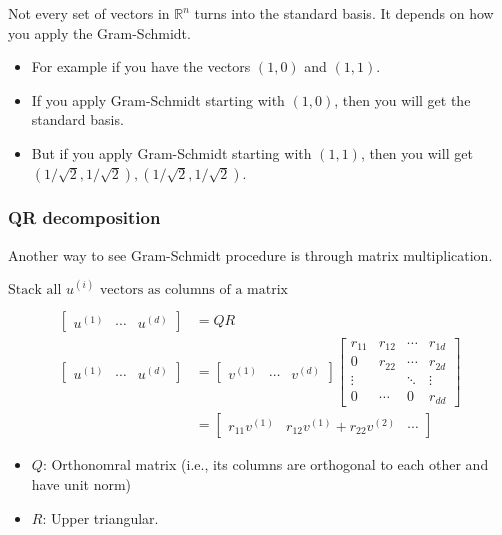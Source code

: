     \begin{warning}
        Not every set of vectors in $\mathbb{R}^n$ turns into the standard basis. It depends on how you apply the Gram-Schmidt. 
        \begin{itemize}
            \item For example if you have the vectors $(1,0)$ and $(1,1)$. 
            \item If you apply Gram-Schmidt starting with $(1,0)$, then you will get the standard basis. 
            \item But if you apply Gram-Schmidt starting with $(1,1)$, then you will get $(1/\sqrt{2},1/\sqrt{2}),(1/\sqrt{2},1/\sqrt{2})$.
        \end{itemize}
    \end{warning}

    \subsubsection{QR decomposition}
    Another way to see Gram-Schmidt procedure is through matrix multiplication.
    \begin{definition}
        $\text{Stack all } u^{(i)} \text{ vectors as columns of a matrix}$

        \begin{align*}
            \begin{bmatrix}
            u^{(1)} & \cdots & u^{(d)}
            \end{bmatrix}
            &= QR \\
            \begin{bmatrix}
            u^{(1)} & \cdots & u^{(d)}
            \end{bmatrix}
            &=
            \begin{bmatrix}
            v^{(1)} & \cdots & v^{(d)}
            \end{bmatrix}
            \begin{bmatrix}
            r_{11} & r_{12} & \cdots & r_{1d} \\
            0      & r_{22} & \cdots & r_{2d} \\
            \vdots &        & \ddots & \vdots \\
            0      & \cdots & 0      & r_{dd}
            \end{bmatrix} \\
            &=
            \begin{bmatrix}
            r_{11}v^{(1)} & r_{12}v^{(1)} + r_{22}v^{(2)} & \cdots
            \end{bmatrix}
        \end{align*}        

        \begin{itemize}
            \item \( Q \): Orthonomral matrix (i.e., its columns are orthogonal to each other and have unit norm) 
            \item \( R \): Upper triangular.
        \end{itemize}        
    \end{definition}
    

